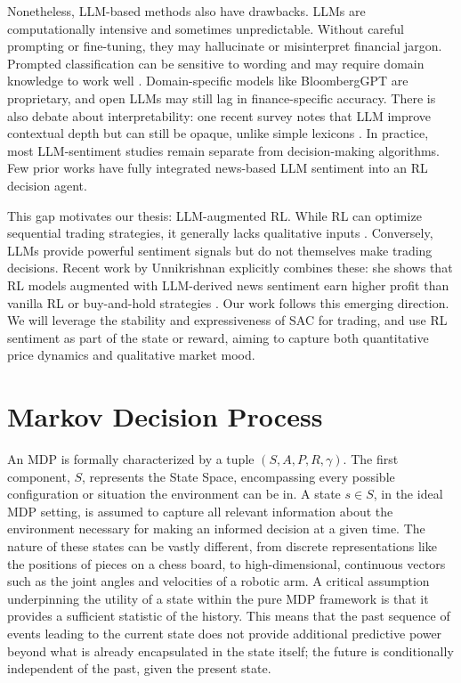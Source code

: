 Nonetheless, \gls{LLM}-based methods also have drawbacks. \gls{LLM}s are computationally intensive and sometimes unpredictable. Without careful prompting or fine-tuning, they may hallucinate or misinterpret financial jargon. Prompted classification can be sensitive to wording and may require domain knowledge to work well \cite{Chen2025}. Domain-specific models like BloombergGPT are proprietary, and open LLMs may still lag in finance-specific accuracy. There is also debate about interpretability: one recent survey notes that \gls{LLM} improve contextual depth but can still be opaque, unlike simple lexicons \cite{Kirtac2024}. In practice, most \gls{LLM}-sentiment studies remain separate from decision-making algorithms. Few prior works have fully integrated news-based \gls{LLM} sentiment into an \gls{RL} decision agent.

This gap motivates our thesis: \gls{LLM}-augmented \gls{RL}. While \gls{RL} can optimize sequential trading strategies, it generally lacks qualitative inputs \cite{Hambly2023}. Conversely, \gls{LLM}s provide powerful sentiment signals but do not themselves make trading decisions. Recent work by Unnikrishnan explicitly combines these: she shows that \gls{RL} models augmented with \gls{LLM}-derived news sentiment earn higher profit than vanilla \gls{RL} or buy-and-hold strategies \cite{Unnikrishnan2024}. Our work follows this emerging direction. We will leverage the stability and expressiveness of \gls{SAC} for trading, and use \gls{RL} sentiment as part of the state or reward, aiming to capture both quantitative price dynamics and qualitative market mood.

\section{Markov Decision Process}
\label{sec:mdp}
An \gls{MDP} is formally characterized by a tuple \((S, A, P, R, \gamma)\). The first component, \(S\), represents the State Space, encompassing every possible configuration or situation the environment can be in. A state \(s \in S\), in the ideal \gls{MDP} setting, is assumed to capture all relevant information about the environment necessary for making an informed decision at a given time. The nature of these states can be vastly different, from discrete representations like the positions of pieces on a chess board, to high-dimensional, continuous vectors such as the joint angles and velocities of a robotic arm. A critical assumption underpinning the utility of a state within the pure \gls{MDP} framework is that it provides a sufficient statistic of the history. This means that the past sequence of events leading to the current state does not provide additional predictive power beyond what is already encapsulated in the state itself; the future is conditionally independent of the past, given the present state.

